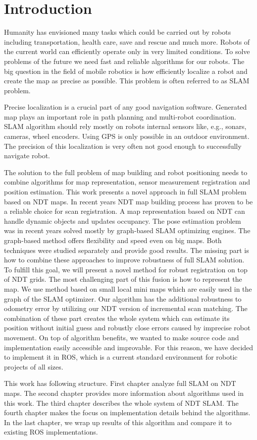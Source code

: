 \chapter*{Introduction}
Humanity has envisioned many tasks which could be carried out by robots including transportation, health care, save and rescue and much more. Robots of the current world can efficiently operate only in very limited conditions. To solve problems of the future we need fast and reliable algorithms for our robots. The big question in the field of mobile robotics is how efficiently localize a robot and create the map as precise as possible. This problem is often referred to as \gls{SLAM} problem.

Precise localization is a crucial part of any good navigation software. Generated map plays an important role in path planning and multi-robot coordination. SLAM algorithm should rely mostly on robots internal sensors like, e.g., sonars, cameras, wheel encoders. Using \gls{GPS} is only possible in an outdoor environment. The precision of this localization is very often not good enough to successfully navigate robot.

The solution to the full problem of map building and robot positioning needs to combine algorithms for map representation, sensor measurement registration and position estimation. This work presents a novel approach in full \gls{SLAM} problem based on \gls{NDT} maps. In recent years \gls{NDT} map building process has proven to be a reliable choice for scan registration. A map representation based on \gls{NDT} can handle dynamic objects and updates occupancy. The pose estimation problem was in recent years solved mostly by graph-based \gls{SLAM} optimizing engines. The graph-based method offers flexibility and speed even on big maps. Both techniques were studied separately and provide good results. The missing part is how to combine these approaches to improve robustness of full \gls{SLAM} solution. To fulfill this goal, we will present a novel method for robust registration on top of \gls{NDT} grids. The most challenging part of this fusion is how to represent the map. We use method based on small local mini maps which are easily used in the graph of the \gls{SLAM} optimizer. Our algorithm has the additional robustness to odometry error by utilizing our \gls{NDT} version of incremental scan matching. The combination of these part creates the whole system which can estimate its position without initial guess and robustly close errors caused by imprecise robot movement. On top of algorithm benefits, we wanted to make source code and implementation easily accessible and improvable. For this reason, we have decided to implement it in \gls{ROS}, which is a current standard environment for robotic projects of all sizes.

This work has following structure. First chapter analyze full \gls{SLAM} on \gls{NDT} maps. The second chapter provides more information about algorithms used in this work. The third chapter describes the whole system of NDT SLAM. The fourth chapter makes the focus on implementation details behind the algorithms. In the last chapter, we wrap up results of this algorithm and compare it to existing \gls{ROS} implementations.  

